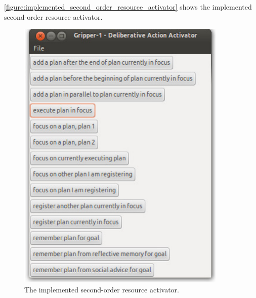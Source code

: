 {\mbox{\autoref{figure:implemented_second_order_resource_activator}}}
shows the implemented second-order resource activator.
\begin{figure}
\includegraphics[width=10cm]{gfx/implemented_second_order_resource_activator}
\caption[The implemented second-order resource activator.]{The
  implemented second-order resource activator.}
\label{figure:implemented_second_order_resource_activator}
\end{figure}

